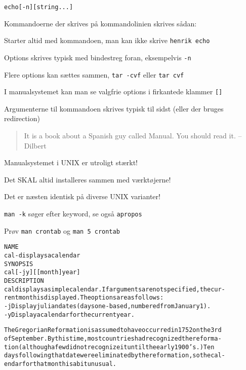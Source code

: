 \documentclass[Screen16to9,17pt]{foils}
\begin{document}


\begin{alltt}
echo [-n] [string ...]
\end{alltt}

\begin{list1}
\item Kommandoerne der skrives på kommandolinien skrives sådan:
\begin{list2}
\item Starter altid med kommandoen, man kan ikke skrive \verb+henrik echo+
\item Options skrives typisk med bindestreg foran, eksempelvis \verb+-n+
\item Flere options kan sættes sammen, \verb+tar -cvf+ eller \verb+tar cvf+
\item I manualsystemet kan man se valgfrie options i firkantede
  klammer \verb+[]+
\item Argumenterne til kommandoen skrives typisk til sidst (eller der
  bruges redirection)
\end{list2}
\end{list1}





\begin{quote}
 It is a book about a Spanish guy called Manual. You should read it.
       -- Dilbert
\end{quote}

\begin{list1}
\item Manualsystemet i UNIX er utroligt stærkt!
\item Det SKAL altid installeres sammen med værktøjerne!
\item Det er næsten identisk på diverse UNIX varianter!
\item \verb+man -k+ søger efter keyword, se også \verb+apropos+
\end{list1}

Prøv \verb+man crontab+ og \verb+man 5 crontab+




\begin{alltt}\footnotesize
\small
NAME
     cal - displays a calendar
SYNOPSIS
     cal [-jy] [[month]  year]
DESCRIPTION
   cal displays a simple calendar.  If arguments are not specified, the cur-
   rent month is displayed.  The options are as follows:
   -j      Display julian dates (days one-based, numbered from January 1).
   -y      Display a calendar for the current year.

The Gregorian Reformation is assumed to have occurred in 1752 on the 3rd
of September.  By this time, most countries had recognized the reforma-
tion (although a few did not recognize it until the early 1900's.)  Ten
days following that date were eliminated by the reformation, so the cal-
endar for that month is a bit unusual.
\end{alltt}
\end{document}
